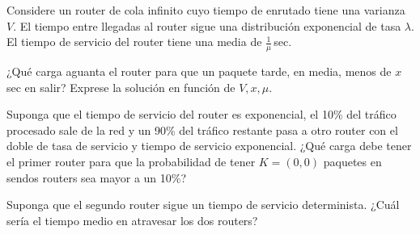 \documentclass{upmassignment}
\date{\today}
\begin{document}
Considere un router de cola infinito cuyo tiempo de enrutado tiene
una varianza $V$. El tiempo entre llegadas al router sigue una
distribución exponencial de tasa $\lambda$.
El tiempo de servicio del router
tiene una media de $\tfrac{1}{\mu}$\,\textrm{sec}.


\begin{problemlist}
    \pbitem ¿Qué carga aguanta el router para que
    un paquete tarde, en media, menos de $x$\,\textrm{sec} en salir? Exprese la solución en función de $V,x,\mu$.

    \begin{solucion}
        
    \end{solucion}

    \pbitem Suponga que el tiempo
    de servicio del router es exponencial,
    el 10\% del tráfico
    procesado sale de la red y un 90\%
    del tráfico restante pasa a otro
    router con el doble de tasa de servicio
    y tiempo de servicio exponencial.
    ¿Qué carga debe tener el primer
    router para que la probabilidad
    de tener $K=(0,0)$ paquetes en sendos
    routers sea mayor a un 10\%?


    \begin{solucion}
        
    \end{solucion}

    \pbitem Suponga que el segundo router
    sigue un tiempo de servicio
    determinista.
    ¿Cuál sería el tiempo medio en
    atravesar los dos routers?

    \begin{solucion}
        
    \end{solucion}

\end{problemlist}
\end{document}
